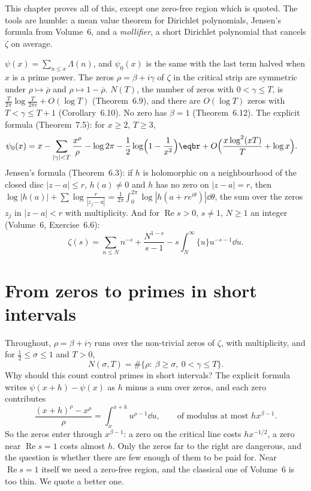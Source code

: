 This chapter proves all of this, except one zero-free region which is quoted. The tools are humble: a mean value theorem for Dirichlet polynomials, Jensen's formula from Volume~6, and a \emph{mollifier}, a short Dirichlet polynomial that cancels $\zeta$ on average.

\begin{reminder}
$\psi(x)=\sum_{n\le x}\Lambda(n)$, and $\psi_0(x)$ is the same with the last term halved when $x$ is a prime power. The zeros $\rho=\beta+i\gamma$ of $\zeta$ in the critical strip are symmetric under $\rho\mapsto\overline\rho$ and $\rho\mapsto1-\overline\rho$. $N(T)$, the number of zeros with $0<\gamma\le T$, is
$\frac T{2\pi}\log\frac T{2\pi e}+O(\log T)$ (Theorem~6.9), and there are $O(\log T)$ zeros with $T<\gamma\le T+1$ (Corollary~6.10). No zero has $\beta=1$ (Theorem~6.12). The explicit formula (Theorem~7.5): for $x\ge2$, $T\ge3$,
\[
\begin{aligned}\psi_0(x)&=x-\sum_{|\gamma|<T}\frac{x^\rho}\rho-\log2\pi-\frac12\log\Bigl(1-\frac1{x^2}\Bigr)\eqbr+O\Bigl(\frac{x\log^2(xT)}T+\log x\Bigr).\end{aligned}
\]
Jensen's formula (Theorem~6.3): if $h$ is holomorphic on a neighbourhood of the closed disc $|z-a|\le r$, $h(a)\ne0$ and $h$ has no zero on $|z-a|=r$, then $\log|h(a)|+\sum\log\frac r{|z_j-a|}=\frac1{2\pi}\int_0^{2\pi}\log|h(a+re^{i\theta})|\dd\theta$, the sum over the zeros $z_j$ in $|z-a|<r$ with multiplicity.
And for $\operatorname{Re}s>0$, $s\ne1$, $N\ge1$ an integer (Volume~6, Exercise~6.6):
\[
\zeta(s)=\sum_{n\le N}n^{-s}+\frac{N^{1-s}}{s-1}-s\int_N^\infty\{u\}u^{-s-1}\dd u.
\]
\end{reminder}

\section{From zeros to primes in short intervals}

Throughout, $\rho=\beta+i\gamma$ runs over the non-trivial zeros of $\zeta$, with multiplicity, and for $\frac12\le\sigma\le1$ and $T>0$,
\[
N(\sigma,T)=\#\{\rho:\ \beta\ge\sigma,\ 0<\gamma\le T\}.
\]
Why should this count control primes in short intervals? The explicit formula writes $\psi(x+h)-\psi(x)$ as $h$ minus a sum over zeros, and each zero contributes
\[
\frac{(x+h)^\rho-x^\rho}\rho=\int_x^{x+h}u^{\rho-1}\dd u,\qquad\text{of modulus at most }hx^{\beta-1}.
\]
So the zeros enter through $x^{\beta-1}$: a zero on the critical line costs $hx^{-1/2}$, a zero near $\operatorname{Re}s=1$ costs almost $h$. Only the zeros far to the right are dangerous, and the question is whether there are few enough of them to be paid for. Near $\operatorname{Re}s=1$ itself we need a zero-free region, and
the classical one of Volume~6 is too thin. We quote a better one.

